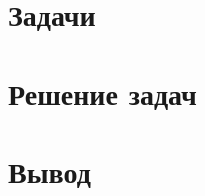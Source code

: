 \documentclass[a4paper, 14pt, report]{ncc}
\begin{document}
\def\chaptername{Часть}
\def\contentsname{Содержание}



\tableofcontents
\clearpage	

\chapter[Задачи]{Задачи}


\chapter[Решение задач]{Решение задач}



\chapter[Вывод]{Вывод}

\end{document}
